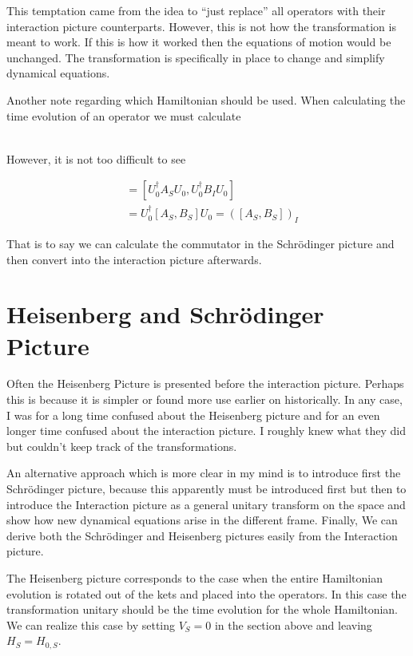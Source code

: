 \documentclass[12pt]{article}
\begin{document}
This temptation came from the idea to ``just replace'' all operators with their interaction picture counterparts. However, this is not how the transformation is meant to work. If this is how it worked then the equations of motion would be unchanged. The transformation is specifically in place to change and simplify dynamical equations.

Another note regarding which Hamiltonian should be used. When calculating the time evolution of an operator we must calculate

\begin{align}
[A_I(t), H_{0,I}(t)]
\end{align}

However, it is not too difficult to see

\begin{align}
[A_I, B_I] &= [U_0^{\dag}A_SU_0, U_0^{\dag}B_IU_0]\\
&= U_0^{\dag}[A_S,B_S]U_0 = \left([A_S,B_S]\right)_I
\end{align}

That is to say we can calculate the commutator in the Schr{\"o}dinger picture and then convert into the interaction picture afterwards.


\section{Heisenberg and Schr{\"o}dinger Picture}

Often the Heisenberg Picture is presented before the interaction picture. Perhaps this is because it is simpler or found more use earlier on historically. In any case, I was for a long time confused about the Heisenberg picture and for an even longer time confused about the interaction picture. I roughly knew what they did but couldn't keep track of the transformations.

An alternative approach which is more clear in my mind is to introduce first the Schr{\"o}dinger picture, because this apparently must be introduced first but then to introduce the Interaction picture as a general unitary transform on the space and show how new dynamical equations arise in the different frame. Finally, We can derive both the Schr{\"o}dinger and Heisenberg pictures easily from the Interaction picture.

The Heisenberg picture corresponds to the case when the entire Hamiltonian evolution is rotated out of the kets and placed into the operators. In this case the transformation unitary should be the time evolution for the whole Hamiltonian. We can realize this case by setting $V_S = 0$ in the section above and leaving $H_S = H_{0,S}$. 
\end{document}
